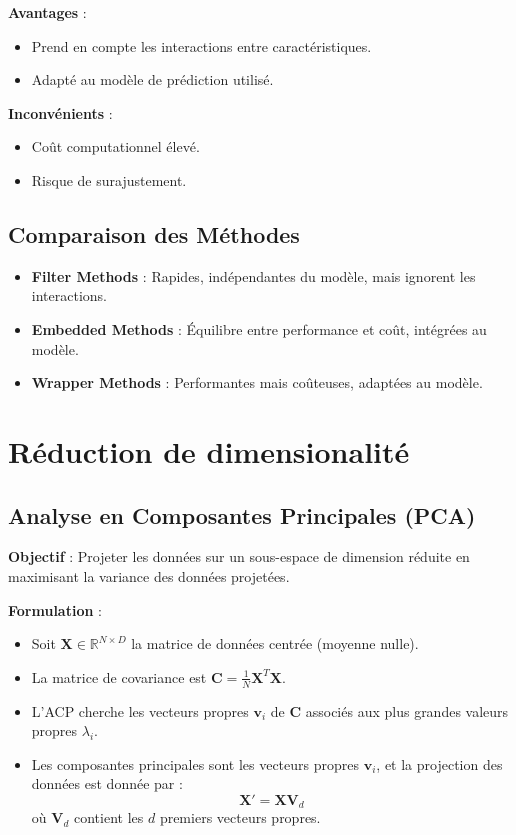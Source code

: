 \documentclass[a4paper,portrait]{article}
\begin{document}
\begin{multicols}{2}
\textbf{Avantages} :
\begin{itemize}
    \item Prend en compte les interactions entre caractéristiques.
    \item Adapté au modèle de prédiction utilisé.
\end{itemize}

\textbf{Inconvénients} :
\begin{itemize}
    \item Coût computationnel élevé.
    \item Risque de surajustement.
\end{itemize}


\subsection{Comparaison des Méthodes}

\begin{itemize}
    \item \textbf{Filter Methods} : Rapides, indépendantes du modèle, mais ignorent les interactions.
    \item \textbf{Embedded Methods} : Équilibre entre performance et coût, intégrées au modèle.
    \item \textbf{Wrapper Methods} : Performantes mais coûteuses, adaptées au modèle.
\end{itemize}

\section{Réduction de dimensionalité}

\subsection{Analyse en Composantes Principales (PCA)}

\textbf{Objectif} : Projeter les données sur un sous-espace de dimension réduite en maximisant la variance des données projetées.

\textbf{Formulation} :
\begin{itemize}
    \item Soit \( \mathbf{X} \in \mathbb{R}^{N \times D} \) la matrice de données centrée (moyenne nulle).
    \item La matrice de covariance est \( \mathbf{C} = \frac{1}{N} \mathbf{X}^T \mathbf{X} \).
    \item L'ACP cherche les vecteurs propres \( \mathbf{v}_i \) de \( \mathbf{C} \) associés aux plus grandes valeurs propres \( \lambda_i \).
    \item Les composantes principales sont les vecteurs propres \( \mathbf{v}_i \), et la projection des données est donnée par :
    \[
    \mathbf{X}' = \mathbf{X} \mathbf{V}_d
    \]
    où \( \mathbf{V}_d \) contient les \( d \) premiers vecteurs propres.
\end{itemize}


\end{multicols}
\end{document}
